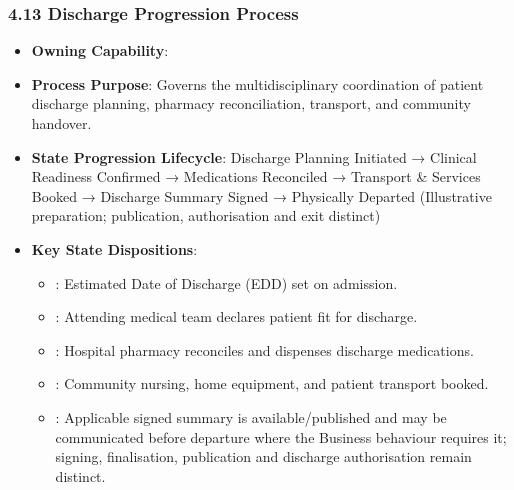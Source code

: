 \par\smallskip
{}\label{rad:processes:263}
\subsubsection*{4.13 Discharge Progression Process}
\label{rad:processes:264}

\begin{itemize}

\item 
\textbf{Owning Capability}: \texttt{}



\item 
\textbf{Process Purpose}: Governs the multidisciplinary coordination of patient discharge planning, pharmacy reconciliation, transport, and community handover.



\item 
\textbf{State Progression Lifecycle}: Discharge Planning Initiated → Clinical Readiness Confirmed → Medications Reconciled → Transport \& Services Booked → Discharge Summary Signed → Physically Departed   (Illustrative preparation; publication, authorisation and exit distinct)



\item 
\textbf{Key State Dispositions}:


\begin{itemize}

\item 
\texttt{}: Estimated Date of Discharge (EDD) set on admission.



\item 
\texttt{}: Attending medical team declares patient fit for discharge.



\item 
\texttt{}: Hospital pharmacy reconciles and dispenses discharge medications.



\item 
\texttt{}: Community nursing, home equipment, and patient transport booked.



\item 
\texttt{}: Applicable signed summary is available/\allowbreak{}published and may be communicated before departure where the Business behaviour requires it; signing, finalisation, publication and discharge authorisation remain distinct.




\end{itemize}
\end{itemize}
